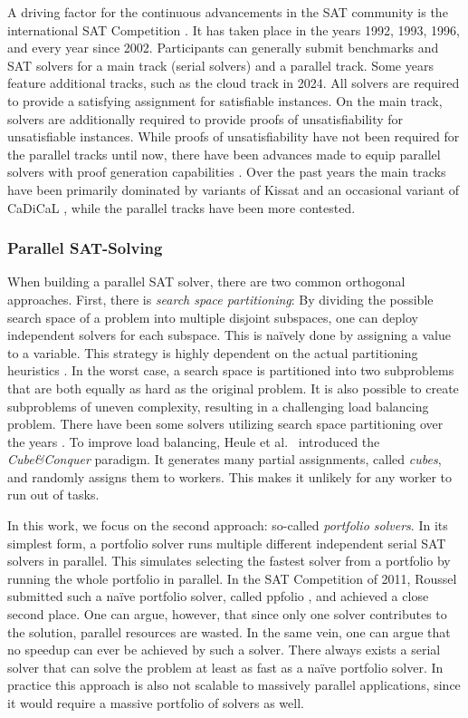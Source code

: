 \documentclass[12pt,a4paper,twoside]{scrartcl}
\numberwithin{equation}{section}
\begin{document}
A driving factor for the continuous advancements in the SAT community is the international SAT Competition \cite{satCompWebsite}. It has taken place in the years 1992, 1993, 1996, and every year since 2002. Participants can generally submit benchmarks and SAT solvers for a main track (serial solvers) and a parallel track. Some years feature additional tracks, such as the cloud track in 2024. All solvers are required to provide a satisfying assignment for satisfiable instances. On the main track, solvers are additionally required to provide proofs of unsatisfiability for unsatisfiable instances. While proofs of unsatisfiability have not been required for the parallel tracks until now, there have been advances made to equip parallel solvers with proof generation capabilities \cite{mallobProofs}.
Over the past years the main tracks have been primarily dominated by variants of Kissat \cite{kissat} and an occasional variant of CaDiCaL \cite{cadical}, while the parallel tracks have been more contested.

\subsubsection{Parallel SAT-Solving}

When building a parallel SAT solver, there are two common orthogonal approaches. First, there is \textit{search space partitioning}: By dividing the possible search space of a problem into multiple disjoint subspaces, one can deploy independent solvers for each subspace. This is na\"ively done by assigning a value to a variable. This strategy is highly dependent on the actual partitioning heuristics \cite{schulz2010cooperate}. In the worst case, a search space is partitioned into two subproblems that are both equally as hard as the original problem. It is also possible to create subproblems of uneven complexity, resulting in a challenging load balancing problem. There have been some solvers utilizing search space partitioning over the years \cite{jurkowiak2001parallelizing, blochinger2003parallel, feldman2005parallel}. To improve load balancing, Heule et al.~\cite{heule2011cube} introduced the \textit{Cube\&Conquer} paradigm. It generates many partial assignments, called \textit{cubes}, and randomly assigns them to workers. This makes it unlikely for any worker to run out of tasks.

In this work, we focus on the second approach: so-called \textit{portfolio solvers}. In its simplest form, a portfolio solver runs multiple different independent serial SAT solvers in parallel. This simulates selecting the fastest solver from a portfolio by running the whole portfolio in parallel. In the SAT Competition of 2011, Roussel submitted such a na\"ive portfolio solver, called ppfolio \cite{ppfolio}, and achieved a close second place. One can argue, however, that since only one solver contributes to the solution, parallel resources are wasted. In the same vein, one can argue that no speedup can ever be achieved by such a solver.  There always exists a serial solver that can solve the problem at least as fast as a na\"ive portfolio solver. In practice this approach is also not scalable to massively parallel applications, since it would require a massive portfolio of solvers as well.
\end{document}
